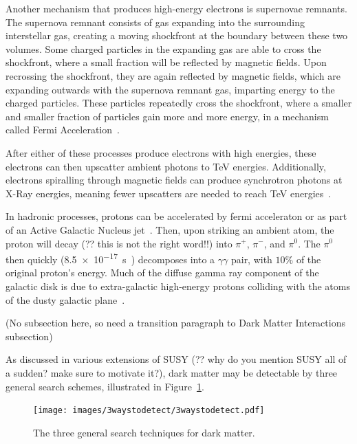   Another mechanism that produces high-energy electrons is supernovae remnants.
  The supernova remnant consists of gas expanding into the surrounding interstellar gas, creating a moving shockfront at the boundary between these two volumes.
  Some charged particles in the expanding gas are able to cross the shockfront, where a small fraction will be reflected by magnetic fields.
  Upon recrossing the shockfront, they are again reflected by magnetic fields, which are expanding outwards with the supernova remnant gas, imparting energy to the charged particles.
  These particles repeatedly cross the shockfront, where a smaller and smaller fraction of particles gain more and more energy, in a mechanism called Fermi Acceleration~\cite{fermi1949,highenergyelectron_snr}.
  
  After either of these processes produce electrons with high energies, these electrons can then upscatter ambient photons to TeV energies.
  Additionally, electrons spiralling through magnetic fields can produce synchrotron photons at X-Ray energies, meaning fewer upscatters are needed to reach TeV energies~\cite{self_compton}.

  In hadronic processes, protons can be accelerated by fermi acceleraton or as part of an Active Galactic Nucleus jet~\cite{hadronic1,hadronic2}.
  Then, upon striking an ambient atom, the proton will {\color{red}decay (?? this is not the right word!!)} into $\pi^{+}$, $\pi^{-}$, and $\pi^{0}$.
  The $\pi^{0}$ then quickly (\SI{8.5e-17}{s}~\cite{pdg2016}) decomposes into a $\gamma\gamma$ pair, with \nicetilde$10\%$ of the original proton's energy.
  Much of the diffuse gamma ray component of the galactic disk is due to extra-galactic high-energy protons colliding with the atoms of the dusty galactic plane~\cite{GalacticDiffuseGammaRays}.

  
  {\color{red}(No subsection here, so need a transition paragraph to Dark Matter Interactions subsection)}
  
    {\color{red}As discussed in various extensions of SUSY (?? why do you mention SUSY all of a sudden? make sure to motivate it?)}, dark matter may be detectable by three general search schemes, illustrated in Figure~\ref{fig:3_searches}.

    \begin{figure}[ht]
      \centering
      \texttt{[image: images/3waystodetect/3waystodetect.pdf]}
      \caption[3 Search Techniques]{
        The three general search techniques for dark matter.}
      \label{fig:3_searches}
    \end{figure}
    

